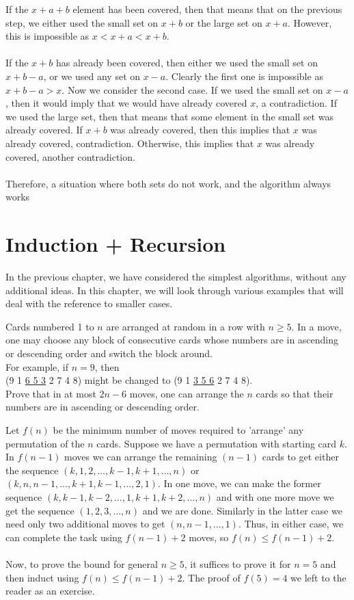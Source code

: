If the $x+a+b$ element has been covered, then that means that on the previous step, we either used the small set on $x+b$ or the large set on $x+a$. However, this is impossible as $x < x+a < x+b$.
\\\\
If the $x+b$ has already been covered, then either we used the small set on $x+b-a$, or we used any set on $x-a$. Clearly the first one is impossible as $x+b-a>x$. Now we consider the second case. If we used the small set on $x-a$, then it would imply that we would have already covered $x$, a contradiction. If we used the large set, then that means that some element in the small set was already covered. If $x+b$ was already covered, then this implies that $x$ was already covered, contradiction. Otherwise, this implies that $x$ was already covered, another contradiction.
\\\\
Therefore, a situation where both sets do not work, and the algorithm always works

\newpage

\section{Induction + Recursion}

In the previous chapter, we have considered the simplest algorithms, without any additional ideas. In this chapter, we will look through various examples that will deal with the reference to smaller cases.

\begin{example}
    Cards numbered 1 to $n$ are arranged at random in a row with $n \geq 5$. In a move, one may choose any block of consecutive cards whose numbers are in ascending or descending order and switch the block around. \\ For example, if $n=9$, then \\ (9 1 \underline{6 5 3} 2 7 4 8) might be changed to (9 1 \underline{3 5 6} 2 7 4 8). \\ Prove that in at most $2n-6$ moves, one can arrange the $n$ cards so that their numbers are in ascending or descending order.
\end{example}

\sol Let $f(n)$ be the minimum number of moves required to 'arrange' any permutation of the $n$ cards. Suppose we have a permutation with starting card  $k$. In $f(n-1)$ moves we can arrange the remaining $(n-1)$ cards to get either the sequence $(k, 1, 2, \dots, k-1, k+1, \dots, n)$ or $(k, n, n-1, \dots, k+1, k-1, \dots, 2, 1)$. In one move, we can make the former sequence $(k, k-1, k-2, \dots, 1, k+1, k+2, \dots, n)$ and with one more move we get the sequence $(1, 2, 3, \dots, n)$ and we are done. Similarly in the latter case we need only two additional moves to get $(n, n-1, \dots, 1)$. Thus, in either case, we can complete the task using $f(n-1) + 2$ moves, so $f(n) \leq f(n-1) + 2$.
\\\\
Now, to prove the bound for general $n \geq 5$, it suffices to prove it for $n=5$ and then induct using $f(n) \leq f(n-1) + 2$. The proof of $f(5)=4$ we left to the reader as an exercise.

